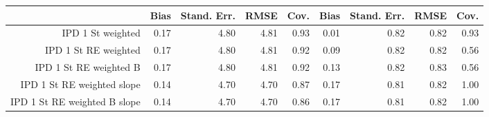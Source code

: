 \begin{table}[ht]
\centering
\begin{tabular}{rrrrrrrrr}
  \toprule
 & Bias & Stand. Err. & RMSE & Cov. & Bias & Stand. Err. & RMSE & Cov. \\ 
  \midrule
IPD 1 St weighted & 0.17 & 4.80 & 4.81 & 0.93 & 0.01 & 0.82 & 0.82 & 0.93 \\ 
  IPD 1 St RE weighted & 0.17 & 4.80 & 4.81 & 0.92 & 0.09 & 0.82 & 0.82 & 0.56 \\ 
  IPD 1 St RE weighted B & 0.17 & 4.80 & 4.81 & 0.92 & 0.13 & 0.82 & 0.83 & 0.56 \\ 
  IPD 1 St RE weighted slope & 0.14 & 4.70 & 4.70 & 0.87 & 0.17 & 0.81 & 0.82 & 1.00 \\ 
  IPD 1 St RE weighted B slope & 0.14 & 4.70 & 4.70 & 0.86 & 0.17 & 0.81 & 0.82 & 1.00 \\ 
   \bottomrule
\end{tabular}
\end{table}
